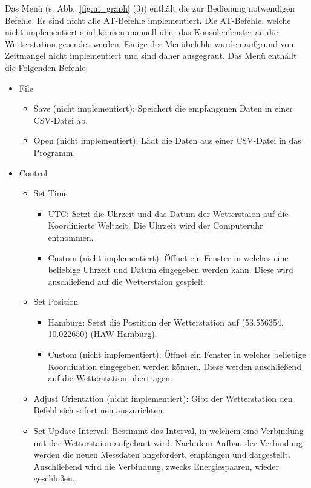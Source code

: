 Das Menü (s. Abb.~\ref{fig:ui_graph} (3)) enthält die zur Bedienung notwendigen Befehle. Es sind nicht alle AT-Befehle implementiert. Die AT-Befehle, welche nicht implementiert sind können manuell über das Konsolenfenster an die Wetterstation gesendet werden. Einige der Menübefehle wurden aufgrund von Zeitmangel nicht implementiert und sind daher ausgegraut. Das Menü enthällt die Folgenden Befehle:
\begin{itemize}
\item File
  \begin{itemize}
  \item Save (nicht implementiert): Speichert die empfangenen Daten in einer CSV-Datei ab.
  \item Open (nicht implementiert): Lädt die Daten aus einer CSV-Datei in das Programm.
  \end{itemize}
\item Control
  \begin{itemize}
  \item Set Time
    \begin{itemize}
    \item UTC: Setzt die Uhrzeit und das Datum der Wetterstaion auf die Koordinierte Weltzeit. Die Uhrzeit wird der Computeruhr entnommen.
    \item Custom (nicht implementiert): Öffnet ein Fenster in welches eine beliebige Uhrzeit und Datum eingegeben werden kann. Diese wird anschließend auf die Wetterstaion gespielt.
    \end{itemize}
  \item Set Position
    \begin{itemize}
    \item Hamburg: Setzt die Postition der Wetterstation auf (53.556354, 10.022650) (HAW Hamburg).
    \item Custom (nicht implementiert): Öffnet ein Fenster in welches beliebige Koordination eingegeben werden können. Diese werden anschließend auf die Wetterstation übertragen.
    \end{itemize}
  \item Adjust Orientation (nicht implementiert): Gibt der Wetterstation den Befehl sich sofort neu auszurichten.
  \item Set Update-Interval: Bestimmt das Interval, in welchem eine Verbindung mit der Wetterstaion aufgebaut wird. Nach dem Aufbau der Verbindung werden die neuen Messdaten angefordert, empfangen und dargestellt. Anschließend wird die Verbindung, zwecks Energiespaaren, wieder geschloßen.
    \begin{itemize}

\end{itemize}
\end{itemize}
\end{itemize}
